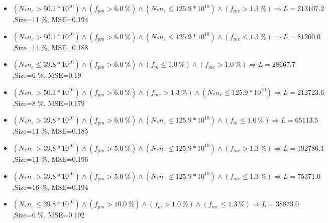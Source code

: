\documentclass[numbered]{CSL}
\begin{document}
\begin{itemize}
\item $(N_* n_e > 50.1 * 10^{10}) \land (f_{pm} > 6.0~\%) \land (N_* n_e \leq 125.9 * 10^{10}) \land (f_{me} > 1.3~\%) \Rightarrow L = 213107.2$,\hfill Size=11 \%, MSE=0.194
\item $(N_* n_e > 50.1 * 10^{10}) \land (f_{pm} > 6.0~\%) \land (N_* n_e \leq 125.9 * 10^{10}) \land (f_{me} \leq 1.3~\%) \Rightarrow L = 81260.0$,\hfill Size=14 \%, MSE=0.188
\item $(N_* n_e \leq 39.8 * 10^{10}) \land (f_{pm} > 6.0~\%) \land (f_m \leq 1.0~\%) \land (f_{me} > 1.0~\%) \Rightarrow L = 28667.7$,\hfill Size=6 \%, MSE=0.19
\item $(N_* n_e > 50.1 * 10^{10}) \land (f_{pm} > 6.0~\%) \land (f_{me} > 1.3~\%) \land (N_* n_e \leq 125.9 * 10^{10}) \Rightarrow L = 212723.6$,\hfill Size=8 \%, MSE=0.179
\item $(N_* n_e > 39.8 * 10^{10}) \land (f_{pm} > 6.0~\%) \land (N_* n_e \leq 125.9 * 10^{10}) \land (f_m \leq 1.0~\%) \Rightarrow L = 65113.5$,\hfill Size=11 \%, MSE=0.185
\item $(N_* n_e > 39.8 * 10^{10}) \land (f_{pm} > 5.0~\%) \land (N_* n_e \leq 125.9 * 10^{10}) \land (f_{me} > 1.3~\%) \Rightarrow L = 192786.1$,\hfill Size=11 \%, MSE=0.196
\item $(N_* n_e > 39.8 * 10^{10}) \land (f_{pm} > 5.0~\%) \land (N_* n_e \leq 125.9 * 10^{10}) \land (f_{me} \leq 1.3~\%) \Rightarrow L = 75371.0$,\hfill Size=16 \%, MSE=0.194
\item $(N_* n_e \leq 39.8 * 10^{10}) \land (f_{pm} > 10.0~\%) \land (f_m > 1.0~\%) \land (f_{me} \leq 1.3~\%) \Rightarrow L = 38873.0$,\hfill Size=6 \%, MSE=0.192
\end{itemize}
\end{document}

